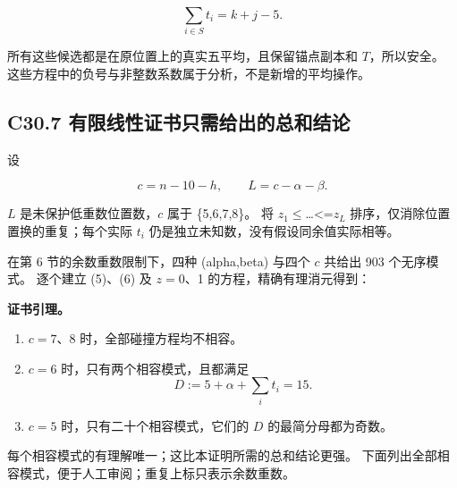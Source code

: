 \documentclass[11pt,a4paper]{article}
\newcommand{\tightlist}{\setlength{\itemsep}{0pt}\setlength{\parskip}{0pt}}
\theoremstyle{definition}
\numberwithin{equation}{section}
\begin{document}
\[
\sum_{i\in S}t_i=k+j-5.
\tag{C30.6}
\]

{所有这些候选都是在原位置上的真实五平均，且保留锚点副本和} {\ensuremath{T}，所以安全。} {这些方程中的负号与非整数系数属于分析，不是新增的平均操作。}

\subsection*{\texorpdfstring{{C30.7} {有限线性证书只需给出的总和结论}}{C30.7 有限线性证书只需给出的总和结论}}\label{C30-h197}

{设}

\[
c=n-10-h,\qquad L=c-\alpha-\beta.
\]

{\ensuremath{L}} {是未保护低重数位置数，\ensuremath{c}} {属于} {\{5,6,7,8\}。} {将} {\ensuremath{z_{1}\le }\ldots\textless=\ensuremath{z_{L}}} {排序，仅消除位置置换的重复；每个实际} {\ensuremath{t_{i}}} {仍是独立未知数，没有假设同余值实际相等。}

{在第} {6} {节的余数重数限制下，四种} {(alpha,beta)} {与四个} {\ensuremath{c}} {共给出} {903} {个无序模式。} {逐个建立} {(5)、(6)} {及} {\ensuremath{z=0}、1} {的方程，精确有理消元得到：}

\textbf{{证书引理。}}

\begin{enumerate}
\def\labelenumi{\arabic{enumi}.}
\tightlist
\item
  {\ensuremath{c=7}、8} {时，全部碰撞方程均不相容。}
\item
  {\ensuremath{c=6}} {时，只有两个相容模式，且都满足} \[
  D:=5+\alpha+\sum_i t_i=15.
  \tag{C30.7}
  \]
\item
  {\ensuremath{c=5}} {时，只有二十个相容模式，它们的} {\ensuremath{D}} {的最简分母都为奇数。}
\end{enumerate}

{每个相容模式的有理解唯一；这比本证明所需的总和结论更强。} {下面列出全部相容模式，便于人工审阅；重复上标只表示余数重数。}
\end{document}
